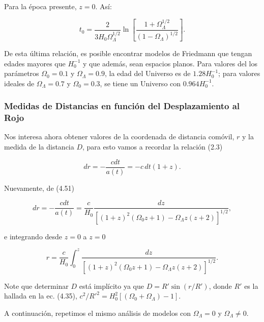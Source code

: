 \documentclass[11pt]{article}
\begin{document}
{\begin{itemize}
        Para la época presente, $z=0$. Así: 
        
        \begin{equation}
            t_0 = \frac{2}{3H_0\Omega_{\Lambda}^{1/2}} \ln \left[\frac{1 + \Omega_{\Lambda}^{1/2}}{(1-\Omega_{\Lambda})^{1/2}} \right].
        \end{equation}
        
        De esta última relación, es posible encontrar modelos de Friedmann que tengan edades mayores que $H_0^{-1}$ y que además, sean espacios planos. Para valores del los parámetros $\Omega_0 = 0.1$ y $\Omega_{\Lambda}=0.9$, la edad del Universo es de $1.28 H_0^{-1}$; para valores ideales de $\Omega_{\Lambda} = 0.7$ y $\Omega_0=0.3$, se tiene un Universo con $0.964 H_0^{-1}$. 
    
    \end{itemize}
    
    \subsubsection{Medidas de Distancias en función del Desplazamiento al Rojo}
    
   Nos interesa ahora obtener valores de la coordenada de distancia comóvil, $r$ y la medida de la distancia $D$, para esto vamos a recordar la relación (2.3)
   
   \begin{equation}
       dr = - \frac{cdt}{a(t)} = -c \, dt (1+z).
   \end{equation}
    
    Nuevamente, de (4.51)
    
    \begin{equation}
         dr = - \frac{cdt}{a(t)} = \frac{c}{H_0}  \frac{dz}{[ (1+z)^2 (\Omega_0 z + 1) - \Omega_{\Lambda} z (z+2) ]^{1/2}},
    \end{equation}
    
    e integrando desde $z=0$ a $z=0$
    
    \begin{equation}
        r = \frac{c}{H_0} \int_0^z{\frac{dz}{[ (1+z)^2 (\Omega_0 z + 1) - \Omega_{\Lambda} z (z+2) ]^{1/2}}}.
    \end{equation}
    
    
    Note que determinar $D$ está implícito ya que $D = R' \sin(r/R')$, donde $R'$ es la hallada en la ec. (4.35), $ c^2/R'^2  = H_0^2 [(\Omega_0 + \Omega_{\Lambda}) - 1]$. 
    
    A continuación, repetimos el mismo análisis de modelos con $\Omega_{\Lambda} =0$ y $\Omega_{\Lambda} \neq 0$. 
    
}
\end{document}
